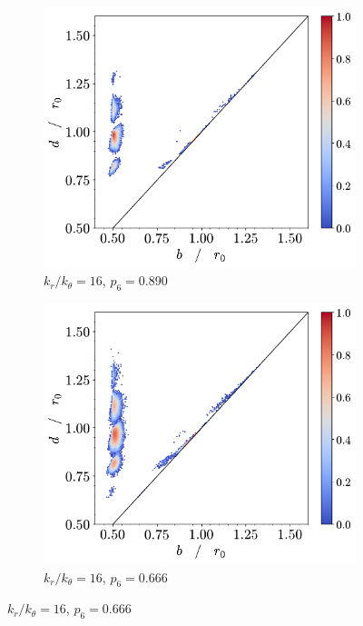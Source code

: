 \begin{figure}[tbp]
	\centering
     
      \begin{subfigure}[b]{0.40\textwidth}
         \centering
         \includegraphics[width=\textwidth]{./figures/ph/t_k16_399_bs_pd.pdf}
         \caption{$k_r/k_\theta=16$, $p_6=0.890$} %
         \label{fig:bspda}
     \end{subfigure}
     \hspace{2cm}
        \begin{subfigure}[b]{0.40\textwidth}
         \centering
         \includegraphics[width=\textwidth]{./figures/ph/t_k16_301_bs_pd.pdf}
         \caption{$k_r/k_\theta=16$, $p_6=0.666$}%
         \label{fig:bspdb}
     \end{subfigure}
     

\end{figure}
